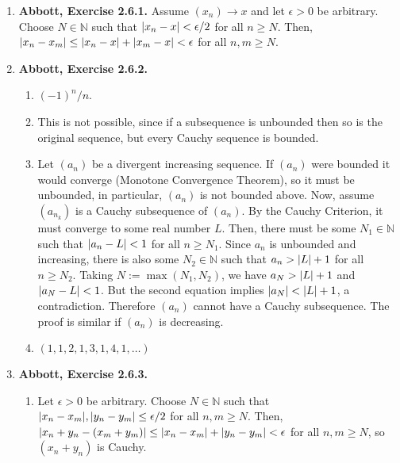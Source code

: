 \documentclass{article}
\DeclarePairedDelimiter\abs{\lvert}{\rvert}
\newcommand{\N}{\mathbb{N}}
\newcommand{\ra}{\rightarrow}
\newcommand{\exc}[2][Abbott]{\item \textbf{#1, Exercise #2.}}
\newcommand{\lep}[1][L]{#1et $\epsilon > 0$ be arbitrary}
\let\oldmax\max
\renewcommand{\max}[1]{\oldmax \left( #1 \right)}
\begin{document}
\begin{enumerate}
    To see that $(a_{n_k}) \ra 0$, \lep[l]. Choose $N \in \N$ such that $N > 1/\epsilon$. Since $s-1/k < a_{n_k} \leq s+1/k$ for every $k \in \N$, then $\abs{a_{n_k} - s} \leq 1/k$. Letting $k \geq N$, we have $\abs{a_{n_k}-s} \leq 1/k < \epsilon$, and we are done.

    \exc{2.6.1}
    Assume $(x_n) \ra x$ and \lep[l]. Choose $N \in \N$ such that $\abs{x_n-x} < \epsilon/2$ for all $n \geq N$. Then, $\abs{x_n-x_m} \leq \abs{x_n-x} + \abs{x_m-x} < \epsilon$ for all $n,m \geq N$.
    
    \exc{2.6.2}
    \begin{enumerate}
        \item $(-1)^n/n$.
        
        \item This is not possible, since if a subsequence is unbounded then so is the original sequence, but every Cauchy sequence is bounded.
        
        \item Let $(a_n)$ be a divergent increasing sequence. If $(a_n)$ were bounded it would converge (Monotone Convergence Theorem), so it must be unbounded, in particular, $(a_n)$ is not bounded above. Now, assume $(a_{n_k})$ is a Cauchy subsequence of $(a_n)$. By the Cauchy Criterion, it must converge to some real number $L$. Then, there must be some $N_1 \in \N$ such that $\abs{a_n - L} < 1$ for all $n \geq N_1$. Since $a_n$ is unbounded and increasing, there is also some $N_2 \in \N$ such that $a_n > \abs{L}+1$ for all $n \geq N_2$. Taking $N := \max{N_1, N_2}$, we have $a_N > \abs{L} + 1$ and $\abs{a_N-L} < 1$. But the second equation implies $\abs{a_N} < \abs{L} + 1$, a contradiction. Therefore $(a_n)$ cannot have a Cauchy subsequence. The proof is similar if $(a_n)$ is decreasing.
        
        \item $(1, 1, 2, 1, 3, 1, 4, 1, \dots)$
    \end{enumerate}
    
    \exc{2.6.3}
    \begin{enumerate}
        \item \lep. Choose $N \in \N$ such that $\abs{x_n-x_m}, \abs{y_n-y_m} \leq \epsilon/2$ for all $n,m \geq N$. Then, $\abs{x_n+y_n-(x_m+y_m)} \leq \abs{x_n-x_m} + \abs{y_n-y_m} < \epsilon$ for all $n,m \geq N$, so $(x_n + y_n)$ is Cauchy.
        

\end{enumerate}
\end{enumerate}
\end{document}
